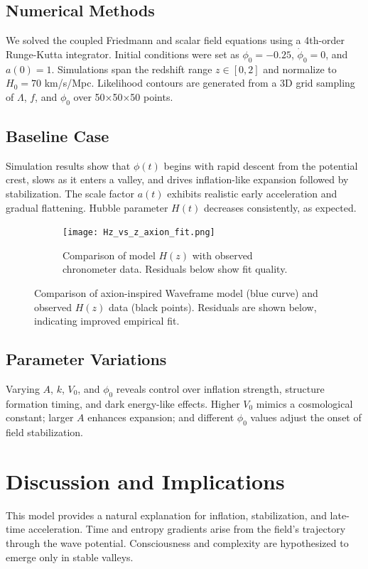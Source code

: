 \documentclass[12pt]{article}
\begin{document}
\subsection*{Numerical Methods}
We solved the coupled Friedmann and scalar field equations using a 4th-order Runge-Kutta integrator.
Initial conditions were set as $\phi_0 = -0.25$, $\dot{\phi}_0 = 0$, and $a(0) = 1$.
Simulations span the redshift range $z \in [0, 2]$ and normalize to $H_0 = 70$ km/s/Mpc.
Likelihood contours are generated from a 3D grid sampling of $\Lambda$, $f$, and $\phi_0$ over 50×50×50 points.

\subsection{Baseline Case}
Simulation results show that $\phi(t)$ begins with rapid descent from the potential crest, slows as it enters a valley, and drives inflation-like expansion followed by stabilization. The scale factor $a(t)$ exhibits realistic early acceleration and gradual flattening. Hubble parameter $H(t)$ decreases consistently, as expected.


\begin{figure}[h!]
\centering
\begin{figure}[h!]
\centering
\texttt{[image: Hz\_vs\_z\_axion\_fit.png]}
\caption{Comparison of model $H(z)$ with observed chronometer data. Residuals below show fit quality.}\label{fig:hz_fit}
\end{figure}\label{fig:hz_fit}
\caption{Comparison of axion-inspired Waveframe model (blue curve) and observed $H(z)$ data (black points). Residuals are shown below, indicating improved empirical fit.}
\end{figure}


\subsection{Parameter Variations}
Varying $A$, $k$, $V_0$, and $\phi_0$ reveals control over inflation strength, structure formation timing, and dark energy-like effects. Higher $V_0$ mimics a cosmological constant; larger $A$ enhances expansion; and different $\phi_0$ values adjust the onset of field stabilization.

\section{Discussion and Implications}
This model provides a natural explanation for inflation, stabilization, and late-time acceleration. Time and entropy gradients arise from the field’s trajectory through the wave potential. Consciousness and complexity are hypothesized to emerge only in stable valleys.
\end{document}
